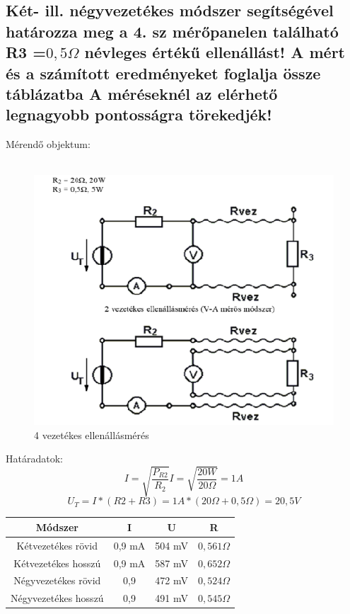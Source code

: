 \documentclass[10pt,a4paper]{article}
\begin{document}
		\subsection{Két- ill. négyvezetékes módszer segítségével határozza meg a 4. sz
mérőpanelen található R3 =$ 0,5\Omega$ névleges értékű ellenállást! A mért és a
számított eredményeket foglalja össze táblázatba A méréseknél az elérhető
legnagyobb pontosságra törekedjék!}
		Mérendő objektum:\\\\
		\begin{figure}[hbtp]
		\centering
		\includegraphics[scale=0.5]{teljes/ket_negy_vez.png}
		\caption{4 vezetékes ellenállásmérés}
		\end{figure}
		
		Határadatok:
		$$I = \sqrt{\frac{P_{R2}}{R_2}} I = \sqrt{\frac{20W}{20\Omega}} = 1 A$$
		$$U_T = I * \left(R2 + R3\right) = 1A * \left(20\Omega + 0,5\Omega\right) = 20,5 V$$\begin{tabular}{|c|c|c|c|}
		\hline 
		Módszer & I & U & R \\ 
		\hline 
		Kétvezetékes rövid & 0,9 mA & 504 mV & $0,561 \Omega$ \\ 
		\hline 
		Kétvezetékes hosszú & 0,9 mA & 587 mV & $0,652 \Omega$ \\ 
		\hline 
		Négyvezetékes rövid & 0,9 & 472 mV & $0,524 \Omega$ \\ 
		\hline 
		Négyvezetékes hosszú & 0,9 & 491 mV & $0,545 \Omega$ \\ 
		\hline 
		\end{tabular} 
\end{document}
